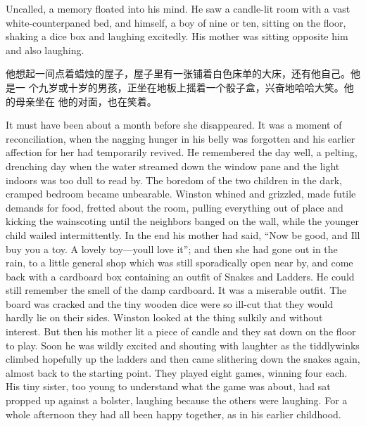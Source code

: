 \begin{paracol}{2}
\switchcolumn*

Uncalled, a memory floated into his mind. He saw a candle-lit room with
a vast white-counterpaned bed, and himself, a boy of nine or ten,
sitting on the floor, shaking a dice box and laughing excitedly. His
mother was sitting opposite him and also laughing.

\switchcolumn

他想起一间点着蜡烛的屋子，屋子里有一张铺着白色床单的大床，还有他自己。他是一
个九岁或十岁的男孩，正坐在地板上摇着一个骰子盒，兴奋地哈哈大笑。他的母亲坐在
他的对面，也在笑着。

\switchcolumn*

It must have been about a month before she disappeared. It was a moment
of reconciliation, when the nagging hunger in his belly was forgotten
and his earlier affection for her had temporarily revived. He remembered
the day well, a pelting, drenching day when the water streamed down the
window pane and the light indoors was too dull to read by. The boredom
of the two children in the dark, cramped bedroom became unbearable.
Winston whined and grizzled, made futile demands for food, fretted about
the room, pulling everything out of place and kicking the wainscoting
until the neighbors banged on the wall, while the younger child wailed
intermittently. In the end his mother had said, ``Now be good, and
I\textquotesingle ll buy you a toy. A lovely
toy---you\textquotesingle ll love it''; and then she had gone out in the
rain, to a little general shop which was still sporadically open near
by, and come back with a cardboard box containing an outfit of Snakes
and Ladders. He could still remember the smell of the damp cardboard. It
was a miserable outfit. The board was cracked and the tiny wooden dice
were so ill-cut that they would hardly lie on their sides. Winston
looked at the thing sulkily and without interest. But then his mother
lit a piece of candle and they sat down on the floor to play. Soon he
was wildly excited and shouting with laughter as the tiddlywinks climbed
hopefully up the ladders and then came slithering down the snakes again,
almost back to the starting point. They played eight games, winning four
each. His tiny sister, too young to understand what the game was about,
had sat propped up against a bolster, laughing because the others were
laughing. For a whole afternoon they had all been happy together, as in
his earlier childhood.

\switchcolumn


\end{paracol}
